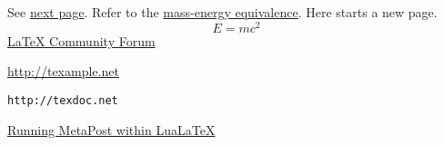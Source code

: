 \documentclass{article}
\begin{document}
See \hyperlink{mytarget}{next page}.
Refer to the \hyperref[eq:einstein]{mass-energy equivalence}.
\newpage
\hypertarget{mytarget}{Here} starts a new page.
\begin{equation}
  \label{eq:einstein}
  E = mc^2 
\end{equation}
\href{http://latex-community.org}{LaTeX Community Forum}

\url{http://texample.net}

\nolinkurl{http://texdoc.net}


\newcommand{\baseaddress}{http://latex-community.org/}
\newcommand{\articleaddress}{\baseaddress
  know-how/latexs-friends/61/486/}
\hyperref{\articleaddress}{running}{lualatex}
  {Running MetaPost within LuaLaTeX}
\end{document}
